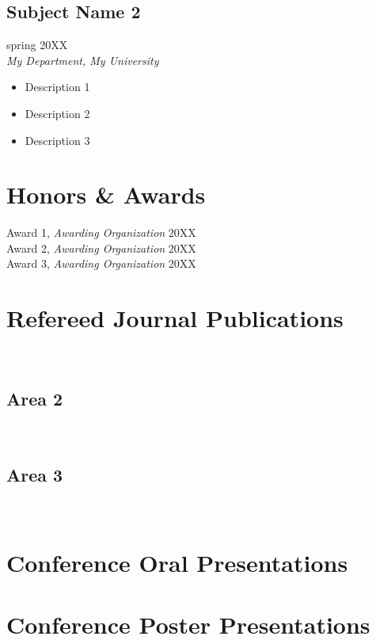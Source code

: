 	\subsection{Subject Name 2} \hfill spring 20XX\\
	\textsl{My Department, My University}
	\begin{itemize}
		\item Description 1
		\item Description 2
		\item Description 3
	\end{itemize}

	\section{Honors \& Awards} 
	Award 1, \textsl{Awarding Organization} \hfill 20XX\\
	Award 2, \textsl{Awarding Organization} \hfill 20XX\\
	Award 3, \textsl{Awarding Organization} \hfill 20XX\\

	\section{Refereed Journal Publications}
	\hfill\\
	\printbibliography[subtype=area1]

	\subsection{Area 2}\hfill\\
	\printbibliography[subtype=area2]

	\subsection{Area 3}\hfill\\
	\printbibliography[subtype=area3]

	\section{Conference Oral Presentations}
	\printbibliography[subtype=oral]

	\section{Conference Poster Presentations}
	\printbibliography[subtype=poster]

